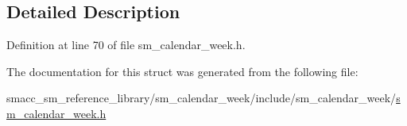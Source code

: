 \subsection{Detailed Description}


Definition at line 70 of file sm\+\_\+calendar\+\_\+week.\+h.



The documentation for this struct was generated from the following file\+:\begin{DoxyCompactItemize}
\item 
smacc\+\_\+sm\+\_\+reference\+\_\+library/sm\+\_\+calendar\+\_\+week/include/sm\+\_\+calendar\+\_\+week/\hyperlink{sm__calendar__week_8h}{sm\+\_\+calendar\+\_\+week.\+h}\end{DoxyCompactItemize}

